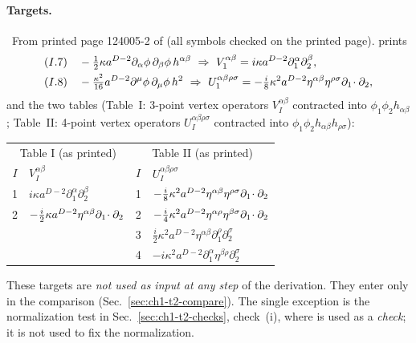 \paragraph{Targets.} \tP\ From printed page 124005-2 of \PI{} (all symbols
checked on the printed page). \PI{} prints
\begin{equation*}
\begin{aligned}
&\eqI{7}\quad -\tfrac12\kappa a^{D-2}\partial_\alpha\phi\,\partial_\beta\phi\,h^{\alpha\beta}\ \Rightarrow\ V_1^{\alpha\beta}=i\kappa a^{D-2}\partial_1^\alpha\partial_2^\beta,\\
&\eqI{8}\quad -\tfrac{\kappa^2}{16}a^{D-2}\partial^\mu\phi\,\partial_\mu\phi\,h^2\ \Rightarrow\ U_1^{\alpha\beta\rho\sigma}=-\tfrac i8\kappa^2a^{D-2}\eta^{\alpha\beta}\eta^{\rho\sigma}\chAdd,
\end{aligned}
\end{equation*}
and the two tables (Table~I: 3-point vertex operators $V_I^{\alpha\beta}$
contracted into $\phi_1\phi_2h_{\alpha\beta}$; Table~II: 4-point vertex
operators $U_I^{\alpha\beta\rho\sigma}$ contracted into
$\phi_1\phi_2h_{\alpha\beta}h_{\rho\sigma}$):
\begin{center}
\small
\begin{tabular}{cl@{\qquad}cl}
\toprule
\multicolumn{2}{c}{Table I (as printed)} & \multicolumn{2}{c}{Table II (as printed)}\\
$I$ & $V_I^{\alpha\beta}$ & $I$ & $U_I^{\alpha\beta\rho\sigma}$\\
\midrule
1 & $i\kappa a^{D-2}\partial_1^\alpha\partial_2^\beta$ & 1 & $-\tfrac i8\kappa^2a^{D-2}\eta^{\alpha\beta}\eta^{\rho\sigma}\partial_1\!\cdot\partial_2$\\
2 & $-\tfrac i2\kappa a^{D-2}\eta^{\alpha\beta}\partial_1\!\cdot\partial_2$ & 2 & $-\tfrac i4\kappa^2a^{D-2}\eta^{\alpha\rho}\eta^{\beta\sigma}\partial_1\!\cdot\partial_2$\\
 & & 3 & $\tfrac i2\kappa^2a^{D-2}\eta^{\alpha\beta}\partial_1^\rho\partial_2^\sigma$\\
 & & 4 & $-i\kappa^2a^{D-2}\partial_1^\alpha\eta^{\beta\rho}\partial_2^\sigma$\\
\bottomrule
\end{tabular}
\end{center}
These targets are \emph{not used as input at any step} of the derivation. They
enter only in the comparison (Sec.~\ref{sec:ch1-t2-compare}). The single
exception is the normalization test in Sec.~\ref{sec:ch1-t2-checks}, check~(i),
where  is used as a \emph{check}; it is not used to fix the normalization.


